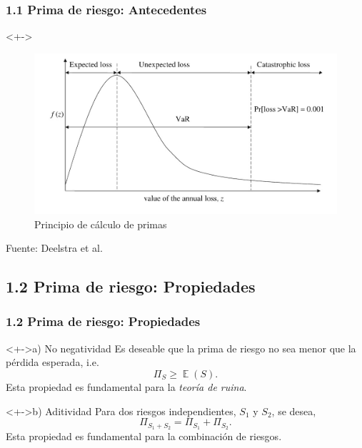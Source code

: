\documentclass[cjk,t,compress]{beamer}
\newcommand{\field}[1]{\mathbb{#1}}
\newcommand{\expec}{\operatorname{\field{E}}}
\begin{document}
\begin{frame}[fragile]
	\frametitle{1.1 Prima de riesgo: Antecedentes}
	\scriptsize  	
		
		\begin{block}<+->{}
		\vspace{0.1cm}
		\begin{figure}[hbtp]
		\caption{Principio de c\'alculo de primas}
		\centering
		\includegraphics[scale=0.41]{Figuras/Loss_distribution.jpeg}
		\end{figure}
		{\tiny Fuente: Deelstra et al.}
		\end{block}  		
	
\end{frame}

%
%
\subsection{1.2 Prima de riesgo: Propiedades}
\begin{frame}[fragile]
	\frametitle{1.2 Prima de riesgo: Propiedades}
	\scriptsize  	
		
		\vspace{0.2cm}
		\begin{block}<+->{a) No negatividad}
		\vspace{0.1cm}
		Es deseable que la prima de riesgo no sea menor que la p\'erdida esperada, i.e.
		\begin{equation}
			\Pi_S \geq \expec(S).
		\end{equation}
		\textcolor{MyDarkGreen}{Esta propiedad es fundamental para la {\it teor\'ia de ruina}.}
		\end{block}  		

		\vspace{0.2cm}
		\begin{block}<+->{b) Aditividad}
		\vspace{0.1cm}
		Para dos riesgos independientes, $S_1$ y $S_2$, se desea,
		\begin{equation}
			\Pi_{S_1+S_2} = \Pi_{S_1}+ \Pi_{S_2}.
		\end{equation}
		\textcolor{MyDarkGreen}{Esta propiedad es fundamental para la combinaci\'on de riesgos.}
		\end{block}  		
	
\end{frame}
\end{document}
